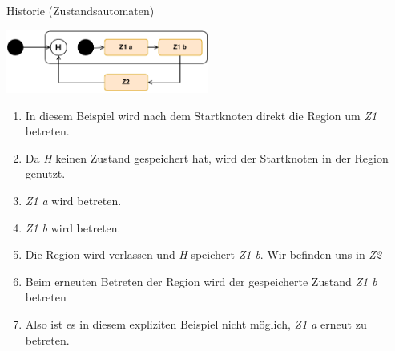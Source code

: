 \begin{example}{Historie (Zustandsautomaten)}
    \begin{center}
        \includegraphics[width=0.5\textwidth]{includes/figures/example_diagrams_state_history.pdf}
    \end{center}

    \begin{enumerate}
        \item In diesem Beispiel wird nach dem Startknoten direkt die Region um \emph{Z1} betreten.
        \item  Da \emph{H} keinen Zustand gespeichert hat, wird der Startknoten in der Region genutzt.
        \item \emph{Z1 a} wird betreten.
        \item \emph{Z1 b} wird betreten.
        \item Die Region wird verlassen und \emph{H} speichert \emph{Z1 b}.
              Wir befinden uns in \emph{Z2}
        \item Beim erneuten Betreten der Region wird der gespeicherte Zustand \emph{Z1 b} betreten
        \item Also ist es in diesem expliziten Beispiel nicht möglich, \emph{Z1 a} erneut zu betreten.
    \end{enumerate}
\end{example}